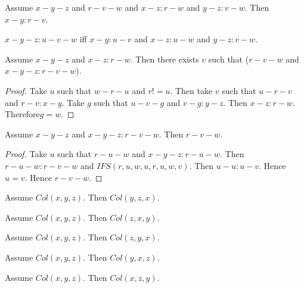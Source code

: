 \documentclass{article}
\begin{document}
  \begin{forthel}
    \begin{axiom}[L4o3]
      Assume $x-y-z$ and $r-v-w$ and $x-z : r-w$ and $y-z : v-w$. Then $x-y : r-v$.
    \end{axiom}

    \begin{definition}[L4o4]
      $x-y-z : u-v-w$ iff $x-y : u-v$ and $x-z : u-w$ and $y-z : v-w$.
    \end{definition}

    \begin{lemma}[L4o5]
      Assume $x-y-z$ and $x-z : r-w$. Then there exists $v$ such that ($r-v-w$ and $x-y-z : r-v-w$).
    \end{lemma}
    \begin{proof}
    	Take $u$ such that $w-r-u$ and $r != u$. Then take $v$ such that $u-r-v$ and $r-v : x-y$. Take $g$ such that $u-v-g$ and $v-g : y-z$. Then $x-z : r-w$. Therefore$ g = w$.
    \end{proof}

    \begin{lemma}[L4o6]
      Assume $x-y-z$ and $x-y-z : r-v-w$. Then $r-v-w$.
    \end{lemma}
    \begin{proof}
    	Take $u$ such that $r-u-w$ and $x-y-z : r-u-w$.	Then $r-u-w : r-v-w$ and $IFS(r,u,w,u,r,u,w,v)$.	Then $u-u : u-v$. Hence $u = v$. Hence $r-v-w$.
    \end{proof}

    \begin{lemma}[L4o11a]
      Assume $Col(x,y,z)$. Then $Col(y,z,x)$.
    \end{lemma}

    \begin{lemma}[L4o11b]
      Assume $Col(x,y,z)$. Then $Col(z,x,y)$.
    \end{lemma}

    \begin{lemma}[L4o11c]
      Assume $Col(x,y,z)$. Then $Col(z,y,x)$.
    \end{lemma}

    \begin{lemma}[L4o11d]
      Assume $Col(x,y,z)$. Then $Col(y,x,z)$.
    \end{lemma}

    \begin{lemma}[L4o11e]
      Assume $Col(x,y,z)$. Then $Col(x,z,y)$.
    \end{lemma}


\end{forthel}
\end{document}
